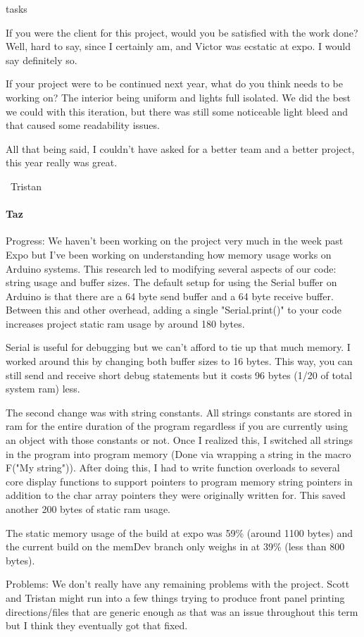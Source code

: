 tasks\documentclass[onecolumn, draftclsnofoot,10pt, compsoc]{IEEEtran}
\begin{document}
If you were the client for this project, would you be satisfied with the work done? Well, hard to say, since I certainly am, and Victor was ecstatic at expo. I would say definitely so.

If your project were to be continued next year, what do you think needs to be working on? The interior being uniform and lights full isolated. We did the best we could with this iteration, but there was still some noticeable light bleed and that caused some readability issues.

All that being said, I couldn't have asked for a better team and a better project, this year really was great.

~Tristan
\paragraph{Taz}
Progress: We haven't been working on the project very much in the week past Expo but I've been working on understanding how memory usage works on Arduino systems. This research led to modifying several aspects of our code: string usage and buffer sizes. The default setup for using the Serial buffer on Arduino is that there are a 64 byte send buffer and a 64 byte receive buffer. Between this and other overhead, adding a single "Serial.print()" to your code increases project static ram usage by around 180 bytes.

Serial is useful for debugging but we can't afford to tie up that much memory. I worked around this by changing both buffer sizes to 16 bytes. This way, you can still send and receive short debug statements but it costs 96 bytes (1/20 of total system ram) less.

The second change was with string constants. All strings constants are stored in ram for the entire duration of the program regardless if you are currently using an object with those constants or not. Once I realized this, I switched all strings in the program into program memory (Done via wrapping a string in the macro F("My string")). After doing this, I had to write function overloads to several core display functions to support pointers to program memory string pointers in addition to the char array pointers they were originally written for. This saved another 200 bytes of static ram usage.

The static memory usage of the build at expo was 59\% (around 1100 bytes) and the current build on the memDev branch only weighs in at 39\% (less than 800 bytes).

Problems: We don't really have any remaining problems with the project. Scott and Tristan might run into a few things trying to produce front panel printing directions/files that are generic enough as that was an issue throughout this term but I think they eventually got that fixed.
\end{document}
